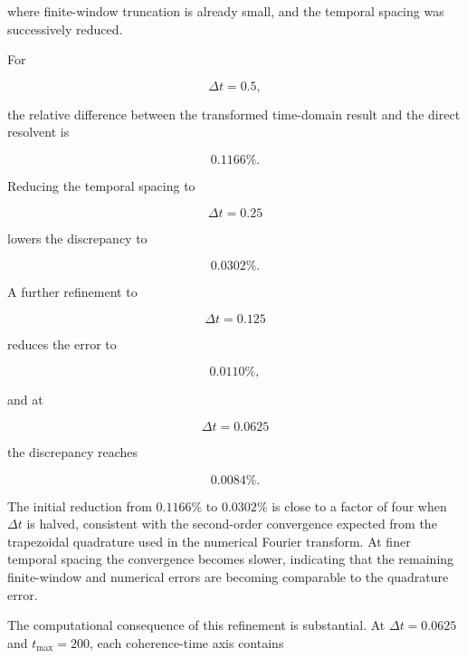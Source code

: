 \documentclass[11pt]{article}
\begin{document}
where finite-window truncation is already small, and the temporal
spacing was successively reduced.

For

\begin{equation}
\Delta t=0.5,
\end{equation}

the relative difference between the transformed time-domain result and
the direct resolvent is

\begin{equation}
0.1166\%.
\end{equation}

Reducing the temporal spacing to

\begin{equation}
\Delta t=0.25
\end{equation}

lowers the discrepancy to

\begin{equation}
0.0302\%.
\end{equation}

A further refinement to

\begin{equation}
\Delta t=0.125
\end{equation}

reduces the error to

\begin{equation}
0.0110\%,
\end{equation}

and at

\begin{equation}
\Delta t=0.0625
\end{equation}

the discrepancy reaches

\begin{equation}
\boxed{
0.0084\%.
}
\end{equation}

The initial reduction from $0.1166\%$ to $0.0302\%$ is close to a
factor of four when $\Delta t$ is halved, consistent with the
second-order convergence expected from the trapezoidal quadrature used
in the numerical Fourier transform.  At finer temporal spacing the
convergence becomes slower, indicating that the remaining
finite-window and numerical errors are becoming comparable to the
quadrature error.

The computational consequence of this refinement is substantial.  At
$\Delta t=0.0625$ and $t_{\max}=200$, each coherence-time axis contains
\end{document}
